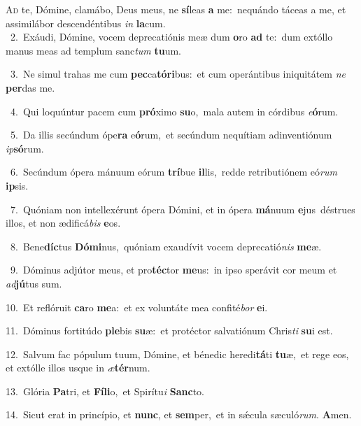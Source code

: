 \lettrine{\initial\textcolor{\initialcolor}{A}}{d} te, Dómine, clamábo, Deus meus, ne \textbf{sí}\-leas \textbf{a} me:~\star nequándo táceas a me, et assimilábor descendéntibus \textit{in} \textbf{la}\-cum.\\
{\numbfont\textcolor{\numbcolor}{~2.}}~Exáudi, Dómine, vocem deprecatiónis meæ dum \textbf{o}\-ro \textbf{ad} te:~\star dum extóllo manus meas ad templum sanc\textit{tum} \textbf{tu}\-um.\par
{\numbfont\textcolor{\numbcolor}{~3.}}~Ne simul trahas me cum \textbf{pec}\-ca\-\textbf{tó}\-\textbf{ri}bus:~\star et cum operántibus iniquitátem \textit{ne} \textbf{per}\-das me.\par
{\numbfont\textcolor{\numbcolor}{~4.}}~Qui loquúntur pacem cum \textbf{pró}\-ximo \textbf{su}\-o,~\star mala autem in córdibus \textit{e}\-\textbf{ó}rum.\par
{\numbfont\textcolor{\numbcolor}{~5.}}~Da illis secúndum ópe\textbf{ra} e\-\textbf{ó}\-rum,~\star et secúndum nequítiam adinventiónum \textit{ip}\-\textbf{só}rum.\par
{\numbfont\textcolor{\numbcolor}{~6.}}~Secúndum ópera mánuum eórum \textbf{trí}\-bue \textbf{il}\-lis,~\star redde retributiónem eó\textit{rum} \textbf{ip}\-sis.\par
{\numbfont\textcolor{\numbcolor}{~7.}}~Quóniam non intellexérunt ópera Dómini, et in ópera \textbf{má}\-nuum \textbf{e}\-jus~\star déstrues illos, et non ædificá\textit{bis} \textbf{e}\-os.\par
{\numbfont\textcolor{\numbcolor}{~8.}}~Bene\-\textbf{díc}\-tus \textbf{Dó}\-\textbf{mi}nus,~\star quóniam exaudívit vocem deprecatió\textit{nis} \textbf{me}\-æ.\par
{\numbfont\textcolor{\numbcolor}{~9.}}~Dóminus adjútor meus, et pro\-\textbf{téc}\-tor \textbf{me}\-us:~\star in ipso sperávit cor meum et \textit{ad}\-\textbf{jú}tus sum.\par
{\numbfont\textcolor{\numbcolor}{10.}}~Et reflóruit \textbf{ca}\-ro \textbf{me}\-a:~\star et ex voluntáte mea confité\textit{bor} \textbf{e}\-i.\par
{\numbfont\textcolor{\numbcolor}{11.}}~Dóminus fortitúdo \textbf{ple}\-bis \textbf{su}\-æ:~\star et protéctor salvatiónum Chris\textit{ti} \textbf{su}\-i est.\par
{\numbfont\textcolor{\numbcolor}{12.}}~Salvum fac pópulum tuum, Dómine, et bénedic heredi\-\textbf{tá}\-ti \textbf{tu}\-æ,~\star et rege eos, et extólle illos usque in \textit{æ}\-\textbf{tér}num.\par
{\numbfont\textcolor{\numbcolor}{13.}}~Glória \textbf{Pa}\-tri, et \textbf{Fí}\-\textbf{li}o,~\star et Spirítu\textit{i} \textbf{Sanc}\-to.\par
{\numbfont\textcolor{\numbcolor}{14.}}~Sicut erat in princípio, et \textbf{nunc}\-, et \textbf{sem}\-per,~\star et in sǽcula sæculó\-\textit{rum}\-. \textbf{A}\-men.\par
